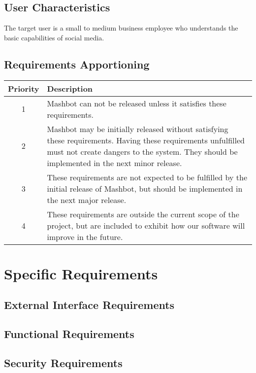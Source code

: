 \documentclass{article}
\begin{document}
	\subsection{User Characteristics}
        The target user is a small to medium business employee who understands
        the basic capabilities of social media.
        
	\subsection{Requirements Apportioning}
        \begin{tabular}{|c|p{4in}|}
          \hline
          \textbf{Priority} & \textbf{Description} \\
          \hline \hline
          1 & Mashbot can not be released unless it satisfies these
              requirements. \\
          \hline
          2 & Mashbot may be initially released without satisfying these
              requirements. Having these requirements unfulfilled must
              not create dangers to the system. They should be implemented in the next
              minor release. \\
          \hline
          3 & These requirements are not expected to be fulfilled by
              the initial release of Mashbot, but should be
              implemented in the next major release. \\
          \hline
          4 & These requirements are outside the current scope of the
              project, but are included to exhibit how our software
              will improve in the future. \\
          \hline
        \end{tabular}

\section{Specific Requirements}
	\subsection{External Interface Requirements}
	\subsection{Functional Requirements}
	\subsection{Security Requirements}
\end{document}
